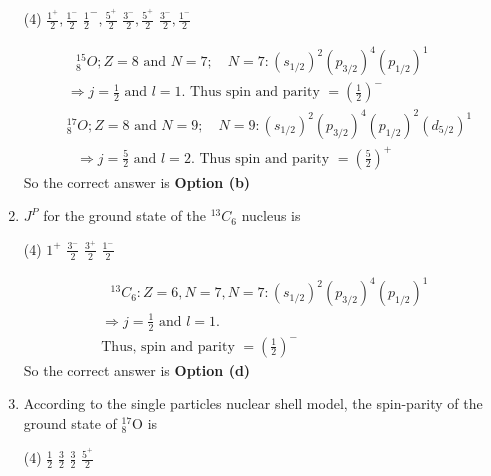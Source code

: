\begin{enumerate}
	{}
	\begin{tasks}(4)
		\task[\textbf{a.}]$\frac{1^{+}}{2}, \frac{1^{-}}{2}$
		\task[\textbf{b.}] $\frac{1}{2}^{-}, \frac{5^{+}}{2}$
		\task[\textbf{c.}]$\frac{3^{-}}{2}, \frac{5^{+}}{2}$
		\task[\textbf{d.}] $\frac{3^{-}}{2}, \frac{1^{-}}{2}$
	\end{tasks}
	\begin{answer}
		\begin{align*}
		&\text{ ${ }_8^{15} O ; Z=8$ and $N=7 ; \quad N=7:\left(s_{1 / 2}\right)^2\left(p_{3 / 2}\right)^4\left(p_{1 / 2}\right)^1$ }\\
		&\text{$\Rightarrow j=\frac{1}{2}$ and $l=1$. Thus spin and parity $=\left(\frac{1}{2}\right)^{-}$ }\\
		&\text{${ }_8^{17} O ; Z=8$ and $N=9 ; \quad N=9:\left(s_{1 / 2}\right)^2\left(p_{3 / 2}\right)^4\left(p_{1 / 2}\right)^2\left(d_{5 / 2}\right)^1$} \\
		&\text{ $\Rightarrow j=\frac{5}{2}$ and $l=2$. Thus spin and parity $=\left(\frac{5}{2}\right)^{+}$}
		\end{align*}
		So the correct answer is \textbf{Option (b)}
	\end{answer}
	\item  $J^P$ for the ground state of the ${ }^{13} C_6$ nucleus is
	{}
	\begin{tasks}(4)
		\task[\textbf{a.}]$1^{+}$
		\task[\textbf{b.}]$\frac{3^{-}}{2}$
		\task[\textbf{c.}]$\frac{3^{+}}{2}$
		\task[\textbf{d.}]$\frac{1^{-}}{2}$ 
	\end{tasks}
	\begin{answer}
		\begin{align*}
		&\text{ ${ }^{13} C_6: Z=6, N=7, N=7:\left(s_{1 / 2}\right)^2\left(p_{3 / 2}\right)^4\left(p_{1 / 2}\right)^1$ }\\
		&\text{$\Rightarrow j=\frac{1}{2}$ and $l=1$.}\\
		&\text{Thus, spin and parity $=\left(\frac{1}{2}\right)^{-}$}
		\end{align*}
		So the correct answer is \textbf{Option (d)}
	\end{answer}
	\item  According to the single particles nuclear shell model, the spin-parity of the ground state of ${ }_8^{17} \mathrm{O}$ is
	{}
	\begin{tasks}(4)
		\task[\textbf{a.}]$\frac{1}{2}$
		\task[\textbf{b.}]$\frac{3}{2}$
		\task[\textbf{c.}]$\frac{3}{2}$
		\task[\textbf{d.}]$\frac{5^{+}}{2}$ 
	\end{tasks}

\end{enumerate}
